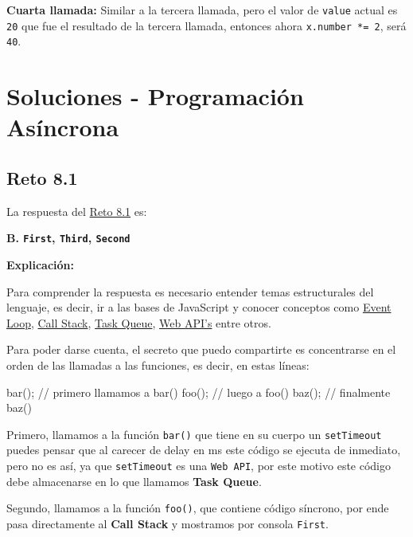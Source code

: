 \documentclass[
  letterpaper,
  DIV=11,
  numbers=noendperiod]{scrreprt}
\newenvironment{Shaded}{\begin{snugshade}}{\end{snugshade}}
\newcommand{\CommentTok}[1]{\textcolor[rgb]{0.37,0.37,0.37}{#1}}
\newcommand{\FunctionTok}[1]{\textcolor[rgb]{0.28,0.35,0.67}{#1}}
\newcommand{\NormalTok}[1]{\textcolor[rgb]{0.00,0.23,0.31}{#1}}
\newcommand{\OperatorTok}[1]{\textcolor[rgb]{0.37,0.37,0.37}{#1}}
\begin{document}
\textbf{Cuarta llamada:} Similar a la tercera llamada, pero el valor de
\texttt{value} actual es \texttt{20} que fue el resultado de la tercera
llamada, entonces ahora \texttt{x.number\ *=\ 2}, será \texttt{40}.

\chapter{Soluciones - Programación
Asíncrona}\label{soluciones---programaciuxf3n-asuxedncrona}

\section{Reto 8.1}\label{sec-sol-cap8-reto1}

La respuesta del \hyperref[sec-cap8-reto1]{Reto 8.1} es:

\textbf{B. \texttt{First}, \texttt{Third}, \texttt{Second}}

\textbf{Explicación:}

Para comprender la respuesta es necesario entender temas estructurales
del lenguaje, es decir, ir a las bases de JavaScript y conocer conceptos
como \hyperref[glos-event_loop]{Event Loop},
\hyperref[glos-call_stack]{Call Stack}, \hyperref[glos-task_queue]{Task
Queue}, \hyperref[glos-web_apis]{Web API's} entre otros.

Para poder darse cuenta, el secreto que puedo compartirte es
concentrarse en el orden de las llamadas a las funciones, es decir, en
estas líneas:

\begin{Shaded}
\begin{Highlighting}[]
\FunctionTok{bar}\NormalTok{()}\OperatorTok{;} \CommentTok{// primero llamamos a bar()}
\FunctionTok{foo}\NormalTok{()}\OperatorTok{;} \CommentTok{// luego a foo()}
\FunctionTok{baz}\NormalTok{()}\OperatorTok{;} \CommentTok{// finalmente baz()}
\end{Highlighting}
\end{Shaded}

Primero, llamamos a la función \texttt{bar()} que tiene en su cuerpo un
\texttt{setTimeout} puedes pensar que al carecer de delay en ms este
código se ejecuta de inmediato, pero no es así, ya que
\texttt{setTimeout} es una \texttt{Web\ API}, por este motivo este
código debe almacenarse en lo que llamamos \textbf{Task Queue}.

Segundo, llamamos a la función \texttt{foo()}, que contiene código
síncrono, por ende pasa directamente al \textbf{Call Stack} y mostramos
por consola \texttt{First}.
\end{document}
